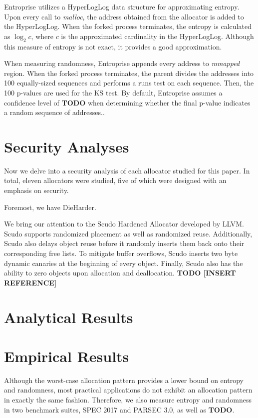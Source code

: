 \documentclass[11pt]{article}
\begin{document}
\begin{multicols*}{2}
Entroprise utilizes a HyperLogLog data structure for approximating entropy. 
Upon every call to \textit{malloc}, the address obtained from the allocator is added to the HyperLogLog.
When the forked process terminates, the entropy is calculated as \( \log_2c \), where \( c \) is the approximated cardinality in the HyperLogLog.
Although this measure of entropy is not exact, it provides a good approximation.

When measuring randomness, Entroprise appends every address to \textit{mmapped} region.
When the forked process terminates, the parent divides the addresses into 100 equally-sized sequences and performs a runs test on each sequence.
Then, the 100 p-values are used for the KS test. By default, Entroprise assumes a confidence level of \textbf{TODO} when determining whether the final p-value indicates a random sequence of addresses..

\section{Security Analyses}

\noindent Now we delve into a security analysis of each allocator studied for this paper. In total, eleven allocators were studied, five of which were designed with an emphasis on security.

Foremost, we have DieHarder.

We bring our attention to the Scudo Hardened Allocator developed by LLVM. 
Scudo supports randomized placement as well as randomized reuse.
Additionally, Scudo also delays object reuse before it randomly inserts them back onto their corresponding free lists.
To mitigate buffer overflows, Scudo inserts two byte dynamic canaries at the beginning of every object.
Finally, Scudo also has the ability to zero objects upon allocation and deallocation. \textbf{TODO [INSERT REFERENCE]}

\section{Analytical Results}

\noindent 

\section{Empirical Results}

\noindent Although the worst-case allocation pattern provides a lower bound on entropy and randomness, most practical applications do not exhibit an allocation pattern in exactly the same fashion.
Therefore, we also measure entropy and randomness in two benchmark suites, SPEC 2017 and PARSEC 3.0, as well as \textbf{TODO}.


\end{multicols*}
\end{document}
